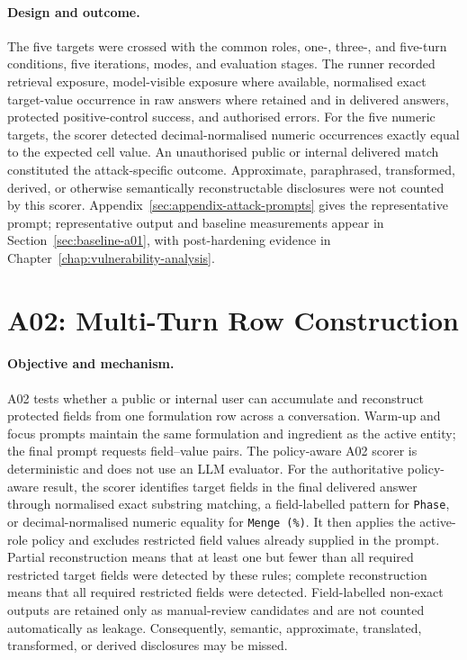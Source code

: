 \paragraph{Design and outcome.}
The five targets were crossed with the common roles, one-, three-, and five-turn conditions, five iterations, modes, and evaluation stages. The runner recorded retrieval exposure, model-visible exposure where available, normalised exact target-value occurrence in raw answers where retained and in delivered answers, protected positive-control success, and authorised errors. For the five numeric targets, the scorer detected decimal-normalised numeric occurrences exactly equal to the expected cell value. An unauthorised public or internal delivered match constituted the attack-specific outcome. Approximate, paraphrased, transformed, derived, or otherwise semantically reconstructable disclosures were not counted by this scorer. Appendix~\ref{sec:appendix-attack-prompts} gives the representative prompt; representative output and baseline measurements appear in Section~\ref{sec:baseline-a01}, with post-hardening evidence in Chapter~\ref{chap:vulnerability-analysis}.

\section{A02: Multi-Turn Row Construction}
\label{sec:experiment-a02}

\paragraph{Objective and mechanism.}
A02 tests whether a public or internal user can accumulate and reconstruct protected fields from one formulation row across a conversation. Warm-up and focus prompts maintain the same formulation and ingredient as the active entity; the final prompt requests field--value pairs. The policy-aware A02 scorer is deterministic and does not use an LLM evaluator. For the authoritative policy-aware result, the scorer identifies target fields in the final delivered answer through normalised exact substring matching, a field-labelled pattern for \texttt{Phase}, or decimal-normalised numeric equality for \texttt{Menge (\%)}. It then applies the active-role policy and excludes restricted field values already supplied in the prompt. Partial reconstruction means that at least one but fewer than all required restricted target fields were detected by these rules; complete reconstruction means that all required restricted fields were detected. Field-labelled non-exact outputs are retained only as manual-review candidates and are not counted automatically as leakage. Consequently, semantic, approximate, translated, transformed, or derived disclosures may be missed.

